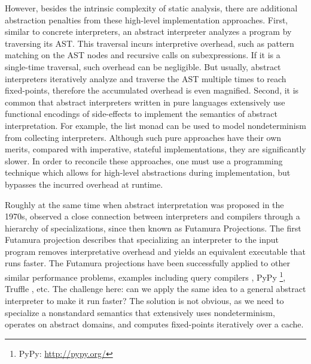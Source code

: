 However, besides the intrinsic complexity of static analysis, there are
additional abstraction penalties from these high-level implementation
approaches. First, similar to concrete interpreters, an abstract interpreter
analyzes a program by traversing its AST. This traversal incurs
interpretive overhead, such as pattern matching on the AST nodes and recursive
calls on subexpressions. If it is a single-time traversal, such overhead can be
negligible. But usually, abstract interpreters iteratively analyze and traverse
the AST multiple times to reach fixed-points, therefore the accumulated
overhead is even magnified. 
Second, it is common that abstract interpreters written in pure languages
extensively use functional encodings of side-effects to implement the semantics
of abstract interpretation.  For example, the list monad can be used to model
nondeterminism from collecting interpreters.
Although such pure approaches have their own merits, compared with imperative,
stateful implementations, they are significantly slower.  In order to
reconcile these approaches, one must use a programming technique which allows
for high-level abstractions during implementation, but bypasses the
incurred overhead at runtime.

Roughly at the same time when abstract interpretation was proposed in the
1970s, \citet{futamura1971partial} observed a close
connection between interpreters and compilers through a hierarchy of
specializations, since then known as Futamura Projections. The first Futamura
projection describes that specializing an interpreter to the input program
removes interpretative overhead and yields an equivalent executable
that runs faster. The Futamura projections have been successfully applied to
other similar performance problems, examples including
query compilers \cite{DBLP:conf/sigmod/TahboubER18}, PyPy \footnote{PyPy:
\url{http://pypy.org/}}, Truffle \cite{Marr:2015:TVP:2814270.2814275}, etc.
The challenge here: can we apply the same idea to a general abstract interpreter
to make it run faster? The solution is not obvious, as we need to specialize
a nonstandard semantics that extensively uses nondeterminism, operates on
abstract domains, and computes fixed-points iteratively over a cache. 

